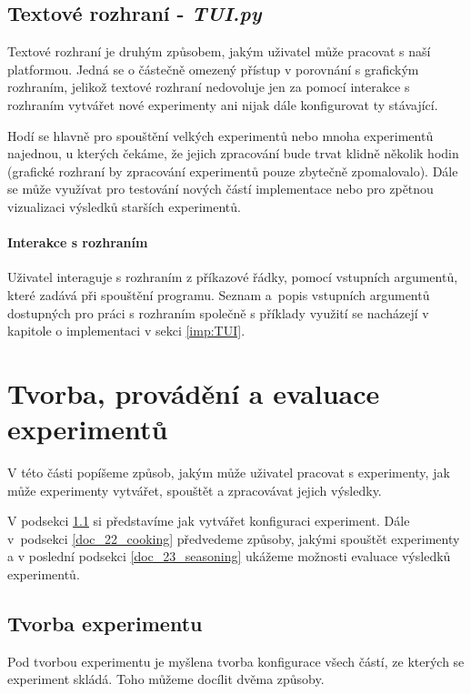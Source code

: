 \subsection{Textové rozhraní - \emph{TUI.py}} \label{doc_13_TUI}

Textové rozhraní je druhým způsobem, jakým uživatel může pracovat s naší
platformou. Jedná se o částečně omezený přístup v porovnání s grafickým
rozhraním, jelikož textové rozhraní nedovoluje jen za pomocí interakce s
rozhraním vytvářet nové experimenty ani nijak dále konfigurovat ty stávající.

Hodí se hlavně pro spouštění velkých experimentů nebo mnoha experimentů
najednou, u kterých čekáme, že jejich zpracování bude trvat klidně několik
hodin (grafické rozhraní by zpracování experimentů pouze zbytečně zpomalovalo).
Dále se může využívat pro testování nových částí implementace nebo pro zpětnou
vizualizaci výsledků starších experimentů.

\paragraph{Interakce s rozhraním}
Uživatel interaguje s rozhraním z příkazové řádky, pomocí vstupních argumentů,
které zadává při spouštění programu. Seznam a~popis vstupních argumentů
dostupných pro práci s rozhraním společně s příklady využití se nacházejí v
kapitole o implementaci v sekci \ref{imp:TUI}. 

\section{Tvorba, provádění a evaluace experimentů} \label{doc_2_experimenty}

V této části popíšeme způsob, jakým může uživatel pracovat s experimenty, jak
může experimenty vytvářet, spouštět a zpracovávat jejich výsledky.

V podsekci \ref{doc_21_mise_en_place} si představíme jak vytvářet
konfiguraci experiment. Dále v~podsekci \ref{doc_22_cooking} předvedeme
způsoby, jakými spouštět experimenty a v poslední podsekci
\ref{doc_23_seasoning} ukážeme možnosti evaluace výsledků experimentů.

\subsection{Tvorba experimentu} \label{doc_21_mise_en_place}

Pod tvorbou experimentu je myšlena tvorba konfigurace všech částí, ze kterých
se experiment skládá. Toho můžeme docílit dvěma způsoby. 

